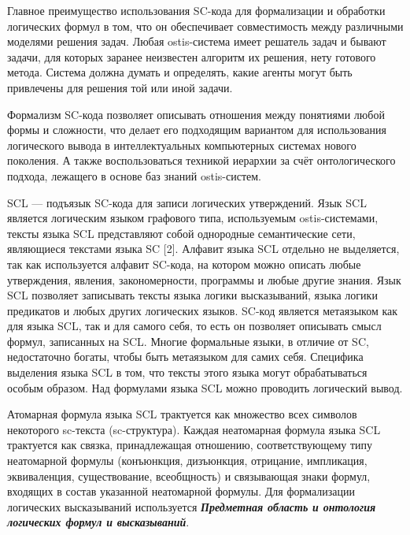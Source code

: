 Главное преимущество использования SC-кода для формализации и обработки логических формул в том, что он обеспечивает совместимость между различными моделями решения задач. Любая ostis-система имеет решатель задач и бывают задачи, для которых заранее неизвестен алгоритм их решения, нету готового метода. Система должна думать и определять, какие агенты могут быть привлечены для решения той или иной задачи.

Формализм SC-кода позволяет описывать отношения между понятиями любой формы и сложности, что делает его подходящим вариантом для использования логического вывода в интеллектуальных компьютерных системах нового поколения. А также воспользоваться техникой иерархии за счёт онтологического подхода, лежащего в основе баз знаний ostis-систем.

SCL — подъязык SC-кода для записи логических утверждений. Язык SCL является логическим языком графового типа, используемым ostis-системами, тексты языка SCL представляют собой однородные семантические сети, являющиеся текстами языка SC [2]. Алфавит языка SCL отдельно не выделяется, так как используется алфавит SC-кода, на котором можно описать любые утверждения, явления, закономерности, программы и любые другие знания. Язык SCL позволяет записывать тексты языка логики высказываний, языка логики предикатов и любых других логических языков. SC-код является метаязыком как для языка SCL, так и для самого себя, то есть он позволяет описывать смысл формул, записанных на SCL. Многие формальные языки, в отличие от SC, недостаточно богаты, чтобы быть метаязыком для самих себя. Специфика выделения языка SCL в том, что тексты этого языка могут обрабатываться особым образом. Над формулами языка SCL можно проводить логический вывод.

Атомарная формула языка SCL трактуется как множество всех символов некоторого sc-текста (sc-структура). Каждая неатомарная формула языка SCL трактуется как связка, принадлежащая отношению, соответствующему типу неатомарной формулы (конъюнкция, дизъюнкция, отрицание, импликация, эквиваленция, существование, всеобщность) и связывающая знаки формул, входящих в состав указанной неатомарной формулы. Для формализации логических высказываний используется \textbf{\textit{Предметная область и онтология логических формул и высказываний}}.

